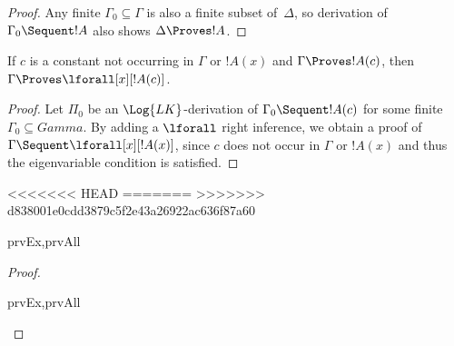 \documentclass[../../include/open-logic-section]{subfiles}
\begin{document}
\begin{proof}
Any finite $\Gamma_0 \subseteq \Gamma$ is also a finite subset
of~$\Delta$, so derivation of $\Gamma_0 \Sequent !A$ also shows
$\Delta \Proves !A$.
\end{proof}

\begin{thm}
 If $c$ is a constant not occurring
in $\Gamma$ or $!A(x)$ and $\Gamma \Proves !A(c)$, then $\Gamma
\Proves \lforall[x][!A(c)]$.
\end{thm}

\begin{proof}
Let $\Pi_0$ be an $\Log{LK}$-derivation of $\Gamma_0 \Sequent !A(c)$
for some finite $\Gamma_0 \subseteq Gamma$.  By adding a $\lforall$
right inference, we obtain a proof of $\Gamma \Sequent
\lforall[x][!A(x)]$, since $c$ does not occur in $\Gamma$ or $!A(x)$
and thus the eigenvariable condition is satisfied.
\end{proof}

\begin{thm}
<<<<<<< HEAD
=======
>>>>>>> d838001e0cdd3879c5f2e43a26922ac636f87a60
\begin{tagenumerate}{prvEx,prvAll}

\end{tagenumerate}
\end{thm}

\begin{proof}
\begin{tagenumerate}{prvEx,prvAll}
\end{tagenumerate}
\end{proof}
\end{document}
